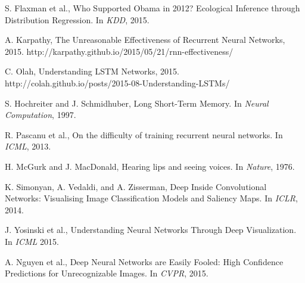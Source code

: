 \begin{thebibliography}{999}
S. Flaxman et al., Who Supported Obama in 2012? Ecological Inference through Distribution Regression. In \textit{KDD}, 2015.

A. Karpathy, The Unreasonable Effectiveness of Recurrent Neural Networks, 2015. http://karpathy.github.io/2015/05/21/rnn-effectiveness/

C. Olah, Understanding LSTM Networks, 2015. \\http://colah.github.io/posts/2015-08-Understanding-LSTMs/

S. Hochreiter and J. Schmidhuber, Long Short-Term Memory. In \textit{Neural Computation}, 1997.

R. Pascanu et al., On the difficulty of training recurrent neural networks. In \textit{ICML}, 2013.

H. McGurk and J. MacDonald, Hearing lips and seeing voices. In \textit{Nature}, 1976.

K. Simonyan, A. Vedaldi, and A. Zisserman, Deep Inside Convolutional Networks: Visualising Image Classification Models and Saliency Maps. In \textit{ICLR}, 2014.

J. Yosinski et al., Understanding Neural Networks Through Deep Visualization. In \textit{ICML} 2015.

A. Nguyen et al., Deep Neural Networks are Easily Fooled: High Confidence Predictions for Unrecognizable Images. In \textit{CVPR}, 2015.

\end{thebibliography}




